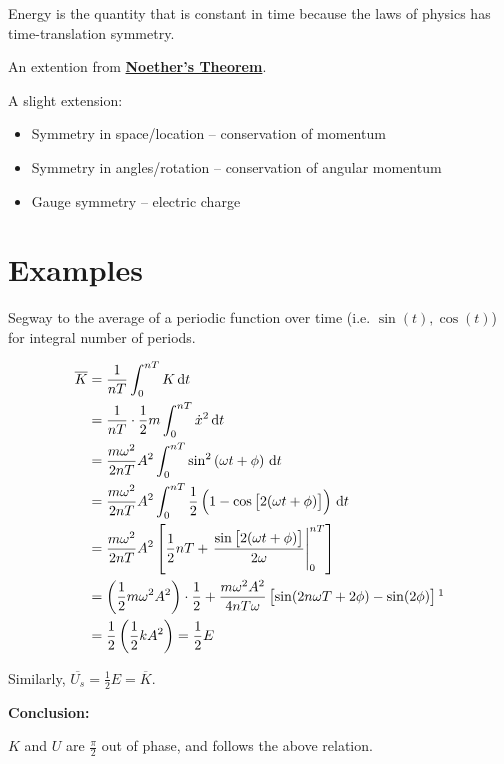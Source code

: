 \begin{definition}
	Energy is the quantity that is constant in time because the laws of physics has time-translation symmetry.

	An extention from \href{https://en.wikipedia.org/wiki/Noether%27s_theorem}{\textbf{Noether's Theorem}}.
\end{definition}

A slight extension:

\begin{itemize}
	\item Symmetry in space/location -- conservation of momentum
	\item Symmetry in angles/rotation -- conservation of angular momentum
	\item Gauge symmetry -- electric charge
\end{itemize}

\section{Examples}

\begin{example}
	Segway to the average of a periodic function over time (i.e. $\sin(t), \cos(t)$) for integral number of periods.
\end{example}

\begin{sol}
	\begin{align}
		\overline{K} &= \frac{1}{nT} \int_0^{nT} K \D t\\
		&= \frac{1}{nT} \cdot \frac{1}{2} m \int_0^{nT} \dot x^2 \D t\\
		&= \frac{m\omega^2}{2nT}A^2 \int_0^{nT} \sin^2\left(\omega t + \phi\right)\D t\\
		&= \frac{m\omega^2}{2nT}A^2 \int_0^{nT} \frac{1}{2} \left(1 - \cos\left[2(\omega t + \phi)\right]\right)\D t\\
		&= \frac{m\omega^2}{2nT}A^2 \left[\frac{1}{2}nT + \left.\frac{\sin\left[2(\omega t + \phi)\right]}{2\omega}\right|_0^{nT}\right]\\
		&= \left(\frac{1}{2}m\omega^2 A^2\right) \cdot \frac{1}{2} + \frac{m\omega^2A^2}{4nT\omega} \left[\sin(2n\omega T + 2\phi) - \sin(2\phi)\right] \footnotemark\\
		&= \frac{1}{2} \left(\frac{1}{2}kA^2\right) = \frac{1}{2}E
	\end{align}

	Similarly, $\overline{U_s} = \frac{1}{2} E = \overline{K}$.

	\textbf{Conclusion:}

	$K$ and $U$ are $\frac{\pi}{2}$ out of phase, and follows the above relation.
\end{sol}

